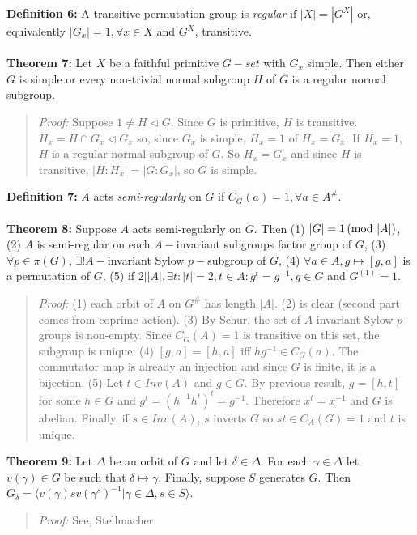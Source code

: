 {\bf Definition 6:}
A transitive permutation group is \emph{regular} if $|X|= |G^X|$ or, equivalently 
$|G_x|=1, \forall x \in X$ and $G^X$, transitive.
\\
\\
{\bf Theorem 7:}
Let $X$ be a faithful primitive $G-set$ with $G_x$ simple.  Then either $G$ is simple or
every non-trivial normal subgroup $H$ of $G$ is a regular normal subgroup.
\begin{quote}
\emph{Proof:}  
Suppose $1 \ne H \lhd G$.  Since $G$ is primitive, $H$ is transitive.  $H_x= H \cap G_x \lhd G_x$
so, since $G_x$ is simple,  $H_x = 1$ of $H_x= G_x$.  If $H_x=1$, $H$ is a regular normal subgroup
of $G$.  So $H_x = G_x$ and since $H$ is transitive, $|H:H_x|= |G:G_x|$, so $G$ is simple.
\end{quote}
{\bf Definition 7:} $A$ acts \emph{semi-regularly} on $G$ if $C_G(a)=1, \forall a \in A^{\#}$.  
\\
\\
{\bf Theorem 8:}
Suppose $A$ acts semi-regularly
on $G$.  Then (1) $|G| = 1 \thinspace \textnormal{(mod } |A| \textnormal{)}$, (2) $A$ is semi-regular on each $A-$invariant
subgroups factor group of $G$, (3) $\forall p \in \pi(G)$, $\exists! A-$invariant
Sylow $p-$subgroup of $G$, (4) $\forall a \in A, g \mapsto [g,a]$ is a permutation of
$G$, (5) if $2 | |A|, \exists t: |t|=2, t \in A: g^t = g^{-1}, g \in G$ and
$G^{(1)}=1$.
\begin{quote}
\emph{Proof:}  
(1) each orbit of $A$ on $G^{\#}$ has length $|A|$.  (2) is clear (second part comes from coprime action).
(3) By Schur, the set of $A$-invariant Sylow $p$-groups is non-empty.  Since $C_G(A)= 1$ is transitive on this
set, the subgroup is unique. (4) $[g,a]= [h,a]$ iff $h g^{-1} \in C_G(a)$.  The commutator map is already an
injection and since $G$ is finite, it is a bijection. (5)  Let $t \in Inv(A)$ and $g \in G$.  By previous result,
$g= [h,t]$ for some $h \in G$ and $g^t = (h^{-1} h^t)^t= g^{-1}$.  Therefore $x^t =x^{-1}$ and $G$ is abelian.
Finally, if $s \in Inv(A)$, $s$ inverts $G$ so $st \in C_A(G)=1$ and $t$ is unique.
\end{quote}
{\bf Theorem 9:}
Let $\Delta$ be an orbit of $G$ and let $\delta \in \Delta$.  For each $\gamma \in \Delta$
let $v(\gamma ) \in G$ be such that $\delta \mapsto \gamma$.  Finally, suppose $S$
generates $G$.  
Then $G_{\delta}= \langle v(\gamma)sv(\gamma^{s})^{-1} | \gamma \in \Delta, s \in S \rangle$.
\begin{quote}
\emph{Proof:}  
See, Stellmacher.
\end{quote}
